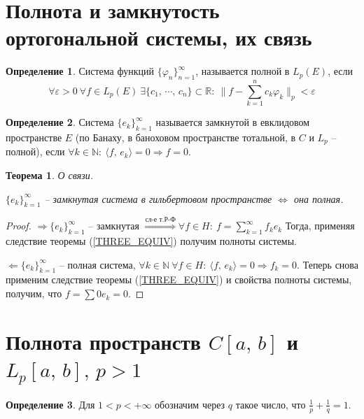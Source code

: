 \documentclass[a4paper,12pt]{article}
\renewcommand{\phi}{\ensuremath{\varphi}}
\theoremstyle{plain}
\newtheorem{theorem}{Теорема}[section]
\theoremstyle{definition}
\newtheorem{definition}{Определение}[section]
\theoremstyle{remark}
\begin{document}
\section{Полнота и замкнутость ортогональной системы, их связь}
\begin{definition}
	Система функций $\{\phi_n\}_{n = 1}^\infty$, называется полной в $L_p(E)$, если
	\[\forall \varepsilon > 0 \: \forall f \in L_p(E)\: \exists \{c_1,\,\cdots,\,c_n\} \subset \mathbb{R}:\: \|f - \sum_{k = 1}^n c_k\phi_k\|_p < \varepsilon\]
\end{definition}

\begin{definition}
	Система $\{e_k\}_{k = 1}^\infty$ называется замкнутой в евклидовом пространстве $E$ (по Банаху, в баноховом пространстве тотальной, в $C$ и $L_p$ -- полной), если $\forall k \in \mathbb{N}:\: \langle f,\, e_k\rangle = 0 \Rightarrow f = 0$.
\end{definition}

\begin{theorem}
	О связи.

	$\{e_k\}_{k = 1}^\infty$ -- замкнутая система в гильбертовом пространстве $\Leftrightarrow$ она полная.
\end{theorem}

\begin{proof}
	$\Rightarrow \{e_k\}_{k = 1}^\infty$ -- замкнутая $\stackrel{\text{сл-е т.Р-Ф}}{\Rightarrow} \forall f \in H:\: f = \sum_{k = 1}^\infty f_ke_k$
	Тогда, применяя следствие теоремы (\ref{THREE_EQUIV}) получим полноты системы.

	$\Leftarrow \{e_k\}_{k = 1}^\infty$ -- полная система, $\forall k \in \mathbb{N} \: \forall f \in H:\: \langle f,\,e_k\rangle = 0 \Rightarrow f_k = 0$. Теперь снова применим следствие теоремы (\ref{THREE_EQUIV}) и свойства полноты системы, получим, что $f = \sum 0e_k = 0$.
\end{proof}

\section{Полнота пространств $C[a,\,b]$ и $L_p[a,\,b],\, p > 1$}
\begin{definition}
	Для $1 < p < +\infty$ обозначим через $q$ такое число, что $\frac{1}{p} + \frac{1}{q} = 1$.
\end{definition}
\end{document}
